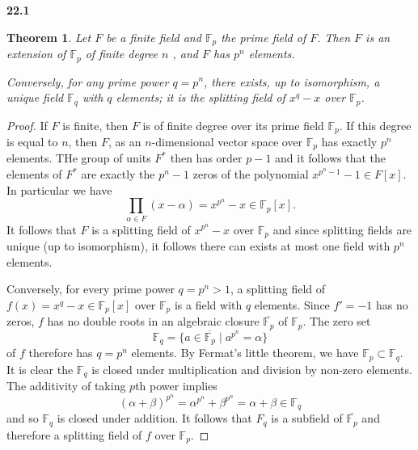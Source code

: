 \documentclass{article}
\theoremstyle{plain}
\newcommand{\F}{\mathbb{F}}
\newtheorem*{theorem*}{Theorem}
\theoremstyle{remark}
\newenvironment{colbox}[1]
    {\newcommand\colboxcolor{B6D0DE}%
    \begin{lrbox}{\selvestebox}%
    \begin{minipage}{\dimexpr\columnwidth-2\fboxsep\relax}\textbf{#1}}
    {\vspace{0.5em}\end{minipage}\end{lrbox}%
    \begin{center}
    \colorbox[HTML]{\colboxcolor}{\usebox{\selvestebox}}
    \end{center}}
\begin{document}
    \begin{colbox}{22.1}
        \begin{theorem*}
            Let $F$ be a finite field and $\F_p$ the prime field of $F$. Then $F$ is an extension of $\F_p$ of finite degree $n$ , and $F$ has $p^n$ elements.

            Conversely, for any prime power $q=p^n$, there exists, up to isomorphism, a unique field $\F_q$ with $q$ elements; it is the splitting field of $x^q-x$ over $\F_p$.
        \end{theorem*}
    \end{colbox}
    \begin{proof}
        If $F$ is finite, then $F$ is of finite degree over its prime field $\F_p$.
        If this degree is equal to $n$, then $F$, as an $n$-dimensional vector space over $\F_p$ has exactly $p^n$ elements. 
        THe group of units $F^*$ then has order $p-1$ and it follows that the elements of $F^*$ are exactly the $p^n-1$ zeros of the polynomial $x^{p^n-1}-1\in F[x]$.
        In particular we have 
        $$\prod_{\alpha\in F}(x-\alpha)=x^{p^n}-x\in\F_p[x].$$
        It follows that $F$ is a splitting field of $x^{p^n}-x$ over $\F_p$ and since splitting fields are unique (up to isomorphism), it follows there can exists at most one field with $p^n$ elements.

        Conversely, for every prime power $q=p^n>1$, a splitting field of $f(x)=x^q-x\in\F_p[x]$ over $\F_p$ is a field with $q$ elements. 
        Since $f'=-1$ has no zeros, $f$ has no double roots in an algebraic closure $\overline{\F_p}$ of $\F_p$.
        The zero set
        $$\F_q=\{a\in\overline{\F_p}\mid a^{p^n}=\alpha\}$$
        of $f$ therefore has $q=p^n$ elements. By Fermat's little theorem, we have $\F_p\subset\F_q$.
        It is clear the $\F_q$ is closed under multiplication and division by non-zero elements. The additivity of taking $p$th power implies
        $$(\alpha+\beta)^{p^n}=\alpha^{p^n}+\beta^{p^n}=\alpha+\beta\in\F_q$$
        and so $\F_q$ is closed under addition. It follows that $F_q$ is a subfield of $\overline{\F_p}$ and therefore a splitting field of $f$ over $\F_p$. 
    \end{proof}
\end{document}

